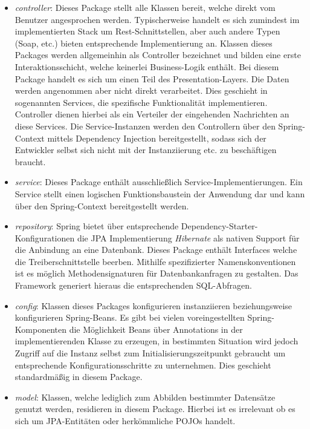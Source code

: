 \begin{itemize}
  \item \emph{controller}: Dieses Package stellt alle Klassen bereit, welche direkt vom Benutzer angesprochen werden. Typischerweise handelt es sich zumindest im implementierten Stack um Rest-Schnittstellen, aber auch andere Typen (Soap, etc.) bieten entsprechende Implementierung an. Klassen dieses Packages werden allgemeinhin als Controller bezeichnet und bilden eine erste Interaktionsschicht, welche keinerlei Business-Logik enthält. Bei diesem Package handelt es sich um einen Teil des Presentation-Layers. Die Daten werden angenommen aber nicht direkt verarbeitet. Dies geschieht in sogenannten Services, die spezifische Funktionalität implementieren. Controller dienen hierbei als ein Verteiler der eingehenden Nachrichten an diese Services. Die Service-Instanzen werden den Controllern über den Spring-Context mittels Dependency Injection bereitgestellt, sodass sich der Entwickler selbst sich nicht mit der Instanziierung etc. zu beschäftigen braucht. 

  \item \emph{service}: Dieses Package enthält ausschließlich Service-Implementierungen. Ein Service stellt einen logischen Funktionsbaustein der Anwendung dar und kann über den Spring-Context bereitgestellt werden.

  \item \emph{repository}: Spring bietet über entsprechende Dependency-Starter-Konfigurationen die JPA Implementierung \emph{Hibernate} als nativen Support für die Anbindung an eine Datenbank. Dieses Package enthält Interfaces welche die Treiberschnittstelle beerben. Mithilfe spezifizierter Namenskonventionen ist es möglich Methodensignaturen für Datenbankanfragen zu gestalten. Das Framework generiert hieraus die entsprechenden SQL-Abfragen.

  \item \emph{config}: Klassen dieses Packages konfigurieren instanziieren beziehungsweise konfigurieren Spring-Beans. Es gibt bei vielen voreingestellten Spring-Komponenten die Möglichkeit Beans über Annotations in der implementierenden Klasse zu erzeugen, in bestimmten Situation wird jedoch Zugriff auf die Instanz selbst zum Initialisierungszeitpunkt gebraucht um entsprechende Konfigurationsschritte zu unternehmen. Dies geschieht standardmäßig in diesem Package.

  \item \emph{model}: Klassen, welche lediglich zum Abbilden bestimmter Datensätze genutzt werden, residieren in diesem Package. Hierbei ist es irrelevant ob es sich um JPA-Entitäten oder herkömmliche POJOs handelt.


\end{itemize}
